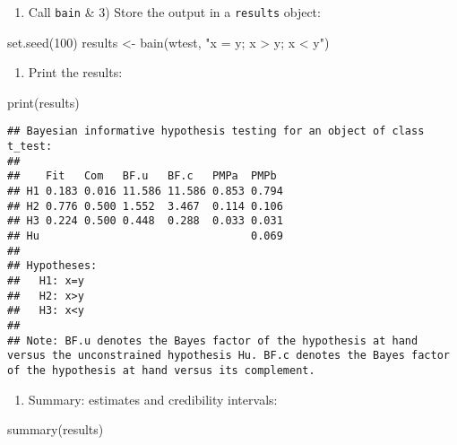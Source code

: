\documentclass[
]{book}
\newenvironment{Shaded}{\begin{snugshade}}{\end{snugshade}}
\newcommand{\DecValTok}[1]{\textcolor[rgb]{0.00,0.00,0.81}{#1}}
\newcommand{\FunctionTok}[1]{\textcolor[rgb]{0.00,0.00,0.00}{#1}}
\newcommand{\NormalTok}[1]{#1}
\newcommand{\OtherTok}[1]{\textcolor[rgb]{0.56,0.35,0.01}{#1}}
\newcommand{\StringTok}[1]{\textcolor[rgb]{0.31,0.60,0.02}{#1}}
\providecommand{\tightlist}{%
  \setlength{\itemsep}{0pt}\setlength{\parskip}{0pt}}
\begin{document}
\begin{enumerate}
\def\labelenumi{\arabic{enumi})}
\setcounter{enumi}{1}
\tightlist
\item
  Call \texttt{bain} \& 3) Store the output in a \texttt{results} object:
\end{enumerate}

\begin{Shaded}
\begin{Highlighting}[]
\FunctionTok{set.seed}\NormalTok{(}\DecValTok{100}\NormalTok{)}
\NormalTok{results }\OtherTok{\textless{}{-}} \FunctionTok{bain}\NormalTok{(wtest, }\StringTok{"x = y; x \textgreater{} y; x \textless{} y"}\NormalTok{)}
\end{Highlighting}
\end{Shaded}

\begin{enumerate}
\def\labelenumi{\arabic{enumi})}
\setcounter{enumi}{2}
\tightlist
\item
  Print the results:
\end{enumerate}

\begin{Shaded}
\begin{Highlighting}[]
\FunctionTok{print}\NormalTok{(results)}
\end{Highlighting}
\end{Shaded}

\begin{verbatim}
## Bayesian informative hypothesis testing for an object of class t_test:
## 
##    Fit   Com   BF.u   BF.c   PMPa  PMPb 
## H1 0.183 0.016 11.586 11.586 0.853 0.794
## H2 0.776 0.500 1.552  3.467  0.114 0.106
## H3 0.224 0.500 0.448  0.288  0.033 0.031
## Hu                                 0.069
## 
## Hypotheses:
##   H1: x=y
##   H2: x>y
##   H3: x<y
## 
## Note: BF.u denotes the Bayes factor of the hypothesis at hand versus the unconstrained hypothesis Hu. BF.c denotes the Bayes factor of the hypothesis at hand versus its complement.
\end{verbatim}

\begin{enumerate}
\def\labelenumi{\arabic{enumi})}
\setcounter{enumi}{3}
\tightlist
\item
  Summary: estimates and credibility intervals:
\end{enumerate}

\begin{Shaded}
\begin{Highlighting}[]
\FunctionTok{summary}\NormalTok{(results)}
\end{Highlighting}
\end{Shaded}
\end{document}
